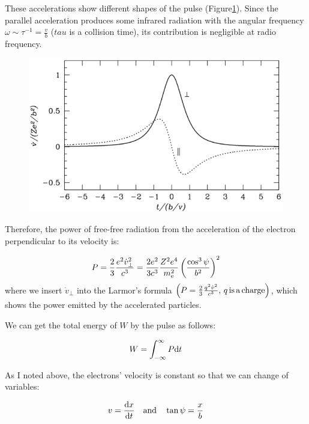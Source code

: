 These accelerations show different shapes of the pulse (Figure\ref{fig:nrao_radio4n3}).
Since the parallel acceleration produces some infrared radiation with the angular frequency $\omega \sim \tau^{-1} = \frac{v}{b}$ ($tau$ is a collision time), its contribution is negligible at radio frequency.

\begin{figure}[htbp]
	\centering
	\includegraphics[width=.7\linewidth]{Chapter_2/Figures/NRAO_radio4n3.png}
    \caption[The acceleration of an electron by an ion]{\label{fig:nrao_radio4n3}
    }
\end{figure}

Therefore, the power of free-free radiation from the acceleration of the electron perpendicular to its velocity is:

\begin{equation}\label{eq:essential_radio4n17}
    P=\frac{2}{3} \frac{e^{2} \dot{v}_{\perp}^{2}}{c^{3}}=\frac{2 e^{2}}{3 c^{3}} \frac{Z^{2} e^{4}}{m_{\mathrm{e}}^{2}}\left(\frac{\cos ^{3} \psi}{b^{2}}\right)^{2}
\end{equation}
where we insert $\dot{v}_{\perp}$ into the Larmor's formula $\left(P = \frac{2}{3}\frac{q^2\dot{v}^2}{c^3},\,q\,\mathrm{is\,a\,charge}\right)$, which shows the power emitted by the accelerated particles.

We can get the total energy of $W$ by the pulse as follows:

\begin{equation}\label{eq:essential_radio4n18}
    W = \int^{\infty}_{-\infty} P \mathrm{d}t
\end{equation}

As I noted above, the electrons' velocity is constant so that we can change of variables:

\begin{equation}\label{eq:essential_radio4n19}
    v = \frac{\mathrm{d} x}{\mathrm{d} t}\ \ \ \mathrm{and}\ \ \ \tan\psi = \frac{x}{b}
\end{equation}

